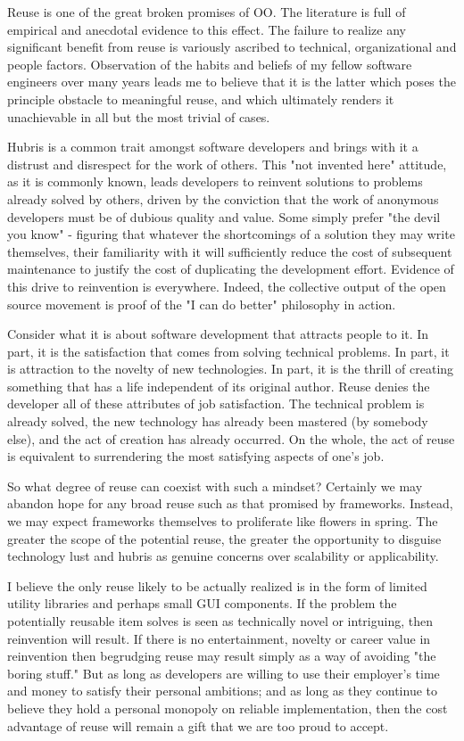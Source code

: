\documentclass{article}
\begin{document}
Reuse is one of the great broken promises of OO. The literature is full
of empirical and anecdotal evidence to this effect. The failure to
realize any significant benefit from reuse is variously ascribed to
technical, organizational and people factors. Observation of the habits
and beliefs of my fellow software engineers over many years leads me to
believe that it is the latter which poses the principle obstacle to
meaningful reuse, and which ultimately renders it unachievable in all
but the most trivial of cases.

Hubris is a common trait amongst software developers and brings with it
a distrust and disrespect for the work of others. This "not invented
here" attitude, as it is commonly known, leads developers to reinvent
solutions to problems already solved by others, driven by the conviction
that the work of anonymous developers must be of dubious quality and
value. Some simply prefer "the devil you know" - figuring that whatever
the shortcomings of a solution they may write themselves, their
familiarity with it will sufficiently reduce the cost of subsequent
maintenance to justify the cost of duplicating the development effort.
Evidence of this drive to reinvention is everywhere. Indeed, the
collective output of the open source movement is proof of the "I can do
better" philosophy in action.

Consider what it is about software development that attracts people to
it. In part, it is the satisfaction that comes from solving technical
problems. In part, it is attraction to the novelty of new technologies.
In part, it is the thrill of creating something that has a life
independent of its original author. Reuse denies the developer all of
these attributes of job satisfaction. The technical problem is already
solved, the new technology has already been mastered (by somebody else),
and the act of creation has already occurred. On the whole, the act of
reuse is equivalent to surrendering the most satisfying aspects of one's
job.

So what degree of reuse can coexist with such a mindset? Certainly we
may abandon hope for any broad reuse such as that promised by
frameworks. Instead, we may expect frameworks themselves to proliferate
like flowers in spring. The greater the scope of the potential reuse,
the greater the opportunity to disguise technology lust and hubris as
genuine concerns over scalability or applicability.

I believe the only reuse likely to be actually realized is in the form
of limited utility libraries and perhaps small GUI components. If the
problem the potentially reusable item solves is seen as technically
novel or intriguing, then reinvention will result. If there is no
entertainment, novelty or career value in reinvention then begrudging
reuse may result simply as a way of avoiding "the boring stuff." But as
long as developers are willing to use their employer's time and money to
satisfy their personal ambitions; and as long as they continue to
believe they hold a personal monopoly on reliable implementation, then
the cost advantage of reuse will remain a gift that we are too proud to
accept.
\end{document}
